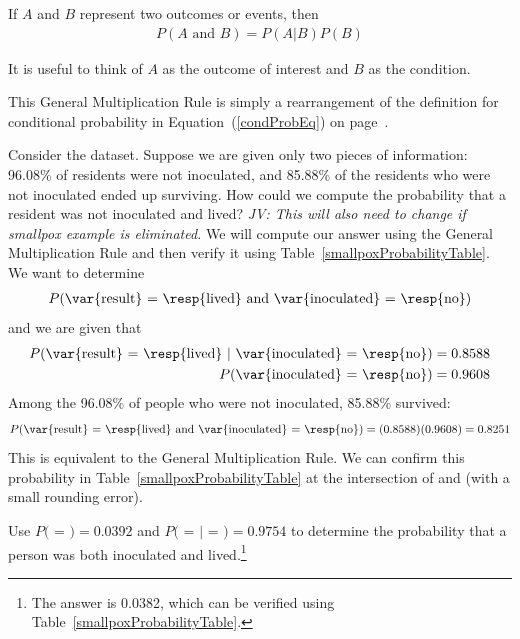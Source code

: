 \begin{termBox}{
If $A$ and $B$ represent two outcomes or events, then \vspace{-1.5mm}
\begin{eqnarray*}
P(A\text{ and }B) = P(A | B) P(B)
\end{eqnarray*} \vspace{-6.5mm} \par
It is useful to think of $A$ as the outcome of interest and $B$ as the condition.}
\end{termBox}
This General Multiplication Rule is simply a rearrangement of the definition for conditional probability in Equation~(\ref{condProbEq}) on page~\pageref{condProbEq}.

\begin{example}{Consider the  dataset. Suppose we are given only two pieces of information: 96.08\% of residents were not inoculated, and 85.88\% of the residents who were not inoculated ended up surviving. How could we compute the probability that a resident was not inoculated and lived? \textit{JV: This will also need to change if smallpox example is eliminated.}}
We will compute our answer using the General Multiplication Rule and then verify it using Table~\ref{smallpoxProbabilityTable}. We want to determine
\begin{eqnarray*}
P(\text{\var{result} = \resp{lived} and \var{inoculated} = \resp{no}})
\end{eqnarray*}
and we are given that
\begin{eqnarray*}
P(\text{\var{result} = \resp{lived} }|\text{ \var{inoculated} = \resp{no}})=0.8588 \\
P(\text{\var{inoculated} = \resp{no}})=0.9608
\end{eqnarray*}
Among the 96.08\% of people who were not inoculated, 85.88\% survived:
\begin{eqnarray*}
P(\text{\var{result} = \resp{lived} and \var{inoculated} = \resp{no}}) = (0.8588) (0.9608) = 0.8251
\end{eqnarray*}
This is equivalent to the General Multiplication Rule. We can confirm this probability in Table~\ref{smallpoxProbabilityTable} at the intersection of  and  (with a small rounding error).
\end{example}

\begin{exercise}
Use $P($ = $) = 0.0392$ and $P($ =  $|$  = $) = 0.9754$ to determine the probability that a person was both inoculated and lived.\footnote{The answer is 0.0382, which can be verified using Table~\ref{smallpoxProbabilityTable}.}
\end{exercise}

